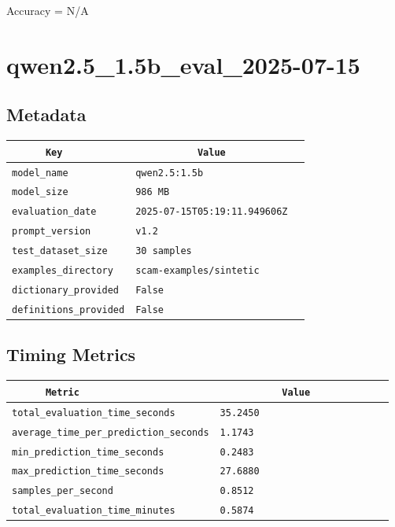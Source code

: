 \documentclass{article}
\begin{document}
\begin{center}
Accuracy = N/A
\end{center}

\section{qwen2.5\_1.5b\_eval\_2025-07-15}
\subsection{Metadata}

\begin{center}
\begin{tabular}{l | l} \hline
    \verb|      Key      | & \verb|           Value           | \\ \hline
    \hline
    \verb|model_name    | & \verb|qwen2.5:1.5b                 | \\ \hline
    \verb|model_size    | & \verb|986 MB                       | \\ \hline
    \verb|evaluation_date| & \verb|2025-07-15T05:19:11.949606Z  | \\ \hline
    \verb|prompt_version| & \verb|v1.2                         | \\ \hline
    \verb|test_dataset_size| & \verb|30 samples                   | \\ \hline
    \verb|examples_directory| & \verb|scam-examples/sintetic       | \\ \hline
    \verb|dictionary_provided| & \verb|False                        | \\ \hline
    \verb|definitions_provided| & \verb|False                        | \\ \hline
\end{tabular}
\end{center}

\subsection{Timing Metrics}

\begin{center}
\begin{tabular}{l | l} \hline
    \verb|      Metric     | & \verb|           Value           | \\ \hline
    \hline
    \verb|total_evaluation_time_seconds| & \verb|35.2450                      | \\ \hline
    \verb|average_time_per_prediction_seconds| & \verb|1.1743                       | \\ \hline
    \verb|min_prediction_time_seconds| & \verb|0.2483                       | \\ \hline
    \verb|max_prediction_time_seconds| & \verb|27.6880                      | \\ \hline
    \verb|samples_per_second| & \verb|0.8512                       | \\ \hline
    \verb|total_evaluation_time_minutes| & \verb|0.5874                       | \\ \hline
\end{tabular}
\end{center}
\end{document}
